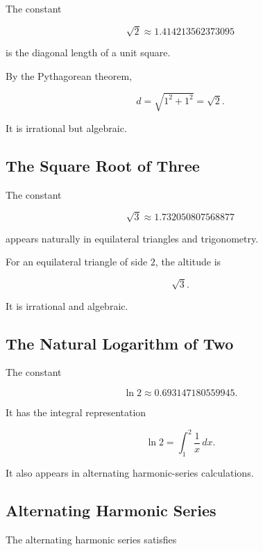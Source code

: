 The constant

\[
\boxed{
\sqrt2
\approx
1.414213562373095
}
\]

is the diagonal length of a unit square.

By the Pythagorean theorem,

\[
\boxed{
d
=
\sqrt{1^2+1^2}
=
\sqrt2.
}
\]

It is irrational but algebraic.

\subsection{The Square Root of Three}
\label{subsec:sqrt3-constant-reference}

The constant

\[
\boxed{
\sqrt3
\approx
1.732050807568877
}
\]

appears naturally in equilateral triangles and trigonometry.

For an equilateral triangle of side \(2\), the altitude is

\[
\boxed{
\sqrt3.
}
\]

It is irrational and algebraic.

\subsection{The Natural Logarithm of Two}
\label{subsec:ln2-constant-reference}

The constant

\[
\boxed{
\ln2
\approx
0.693147180559945.
}
\]

It has the integral representation

\[
\boxed{
\ln2
=
\int_1^2
\frac{1}{x}\,dx.
}
\]

It also appears in alternating harmonic-series calculations.

\subsection{Alternating Harmonic Series}
\label{subsec:alternating-harmonic-constant}

The alternating harmonic series satisfies

